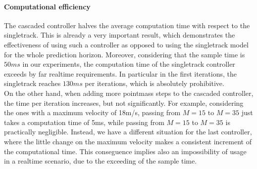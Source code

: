 \documentclass[a4paper, onecolumn, 12pt]{article}
\begin{document}
\paragraph{Computational efficiency}
The cascaded controller halves the average computation time with respect to the
singletrack. This is already a very important result, which demonstrates the 
effectiveness of using such a
controller as opposed to using the singletrack model for the whole prediction
horizon. Moreover, considering that the sample time is $50ms$ in our experiments, the
computation time of the singletrack controller exceeds by far realtime
requirements. In particular in the first iterations, the singletrack reaches $130ms$
per iterations, which is absolutely prohibitive. \\
On the other hand, when adding more pointmass steps to the cascaded controller, the 
time per iteration increases, but not significantly. 
For example, considering the ones with a maximum velocity of 18m/s, passing from 
$M=15$ to $M=35$ just takes a computation time of 5ms, while passing from $M=15$ to $M=35$
is practically negligible. Instead, we have a different situation for the last controller, 
where the little change on the maximum velocity makes a consistent increment of the 
computational time. This conseguence implies also an impossibility of usage in a realtime 
scenario, due to the exceeding of the sample time.
\end{document}
